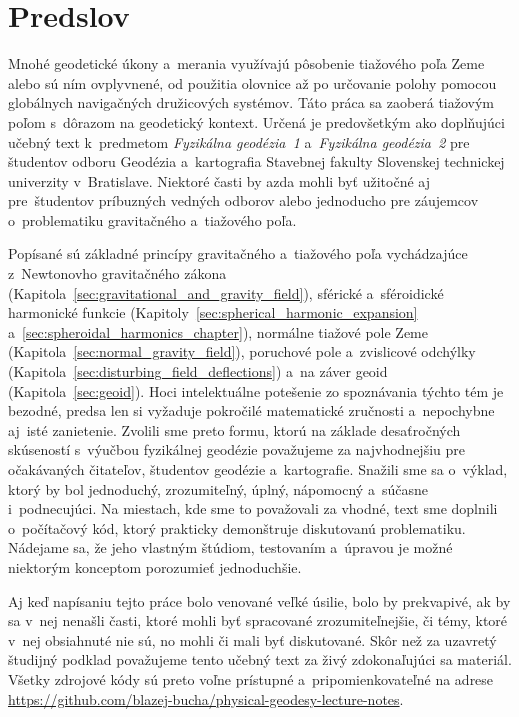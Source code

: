 \documentclass[a4paper, 12pt]{book}
\begin{document}

\chapter*{Predslov}

Mnohé geodetické úkony a~merania využívajú pôsobenie tiažového poľa Zeme alebo 
sú ním ovplyvnené, od použitia olovnice až po určovanie polohy pomocou 
globálnych navigačných družicových systémov.  Táto práca sa zaoberá tiažovým 
poľom s~dôrazom na geodetický kontext.  Určená je predovšetkým ako doplňujúci 
učebný text k~predmetom \emph{Fyzikálna geodézia~1} a~\emph{Fyzikálna 
geodézia~2} pre študentov odboru Geodézia a~kartografia Stavebnej fakulty 
Slovenskej technickej univerzity v~Bratislave.  Niektoré časti by azda mohli 
byť užitočné aj pre~študentov príbuzných vedných odborov alebo jednoducho pre 
záujemcov o~problematiku gravitačného a~tiažového poľa.

Popísané sú základné princípy gravitačného a~tiažového poľa vychádzajúce 
z~Newtonovho gravitačného zákona 
(Kapitola~\ref{sec:gravitational_and_gravity_field}), sférické a~sféroidické 
harmonické funkcie (Kapitoly~\ref{sec:spherical_harmonic_expansion} 
a~\ref{sec:spheroidal_harmonics_chapter}), normálne tiažové pole Zeme 
(Kapitola~\ref{sec:normal_gravity_field}), poruchové pole a~zvislicové odchýlky 
(Kapitola~\ref{sec:disturbing_field_deflections}) a~na záver geoid 
(Kapitola~\ref{sec:geoid}).  Hoci intelektuálne potešenie zo spoznávania týchto 
tém je bezodné, predsa len si vyžaduje pokročilé matematické zručnosti 
a~nepochybne aj~isté zanietenie.  Zvolili sme preto formu, ktorú na základe 
desaťročných skúseností s~výučbou fyzikálnej geodézie považujeme za 
najvhodnejšiu pre očakávaných čitateľov, študentov geodézie a~kartografie.  
Snažili sme sa o~výklad, ktorý by bol jednoduchý, zrozumiteľný, úplný, 
nápomocný a~súčasne i~podnecujúci.  Na miestach, kde sme to považovali za 
vhodné, text sme doplnili o~počítačový kód, ktorý prakticky demonštruje 
diskutovanú problematiku.  Nádejame sa, že jeho vlastným štúdiom, testovaním 
a~úpravou je možné niektorým konceptom porozumieť jednoduchšie.

Aj keď napísaniu tejto práce bolo venované veľké úsilie, bolo by prekvapivé, ak 
by sa v~nej nenašli časti, ktoré mohli byť spracované zrozumiteľnejšie, či 
témy, ktoré v~nej obsiahnuté nie sú, no mohli či mali byť diskutované.  Skôr 
než za uzavretý študijný podklad považujeme tento učebný text za živý 
zdokonaľujúci sa materiál.  Všetky zdrojové kódy sú preto voľne prístupné 
a~pripomienkovateľné na adrese 
\url{https://github.com/blazej-bucha/physical-geodesy-lecture-notes}.
\end{document}
